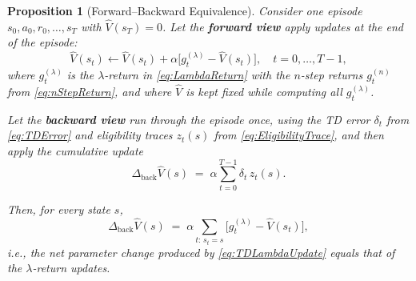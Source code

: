 \documentclass[
]{book}
\newtheorem{proposition}{Proposition}[chapter]
\theoremstyle{definition}
\theoremstyle{definition}
\theoremstyle{definition}
\theoremstyle{definition}
\theoremstyle{remark}
\begin{document}
\begin{proposition}[Forward–Backward Equivalence]
\protect\hypertarget{prp:ForwardBackwardEquivalence}{}\label{prp:ForwardBackwardEquivalence}Consider one episode \(s_0,a_0,r_0,\ldots,s_T\) with \(\hat V(s_T)=0\). Let the \textbf{forward view} apply updates at the end of the episode:
\[
\hat V(s_t) \leftarrow \hat V(s_t) + \alpha \big[g_t^{(\lambda)}-\hat V(s_t)\big],
\quad t=0,\ldots,T-1,
\]
where \(g_t^{(\lambda)}\) is the \(\lambda\)-return in \eqref{eq:LambdaReturn} with the \(n\)-step returns \(g_t^{(n)}\) from \eqref{eq:nStepReturn}, and where \(\hat V\) is kept fixed while computing all \(g_t^{(\lambda)}\).

Let the \textbf{backward view} run through the episode once, using the TD error \(\delta_t\) from \eqref{eq:TDError} and eligibility traces \(z_t(s)\) from \eqref{eq:EligibilityTrace}, and then apply the cumulative update
\[
\Delta_{\text{back}} \hat V(s) \;=\; \alpha \sum_{t=0}^{T-1} \delta_t\, z_t(s).
\]

Then, for every state \(s\),
\[
\Delta_{\text{back}} \hat V(s)
\;=\;
\alpha \sum_{t:\, s_t=s}\big[g_t^{(\lambda)}-\hat V(s_t)\big],
\]
i.e., the net parameter change produced by \eqref{eq:TDLambdaUpdate} equals that of the \(\lambda\)-return updates.
\end{proposition}
\end{document}
